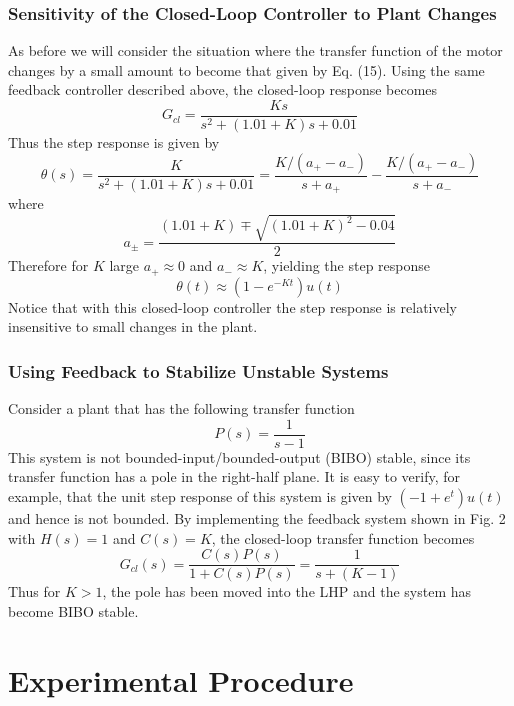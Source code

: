 \documentclass[12pt]{article}
\begin{document}
\subsubsection{Sensitivity of the Closed-Loop Controller to Plant Changes}
As before we will consider the situation where the transfer function of the motor changes by a small amount
to become that given by Eq. (15). Using the same feedback controller described above, the closed-loop
response becomes
\begin{equation}
G_{cl}=\frac{Ks}{s^2+(1.01+K)s+0.01}
\end{equation}
Thus the step response is given by
\begin{equation}
\theta(s)=\frac{K}{s^2+(1.01+K)s+0.01}=\frac{K/(a_+-a_-)}{s+a_+}-\frac{K/(a_+-a_-)}{s+a_-}
\end{equation}
where
\begin{equation}
a_\pm=\frac{(1.01+K)\mp\sqrt{(1.01+K)^2-0.04}}{2}
\end{equation}
Therefore for $K$ large $a_+\approx0$ and $a_-\approx K$, yielding the step response 
\begin{equation}
\theta(t)\approx(1-e^{-Kt})u(t)
\end{equation}
Notice that with this closed-loop controller the step response is relatively insensitive to small changes in the
plant.
\subsubsection{Using Feedback to Stabilize Unstable Systems}
Consider a plant that has the following transfer function
\begin{equation}
P(s)=\frac{1}{s-1}
\end{equation}
This system is not bounded-input/bounded-output (BIBO) stable, since its transfer function has a pole in
the right-half plane. It is easy to verify, for example, that the unit step response of this system is given by
$(−1 + e^t)u(t)$ and hence is not bounded. By implementing the feedback system shown in Fig. 2 with
$H(s)=1$ and $C(s)=K$, the closed-loop transfer function becomes
\begin{equation}
G_{cl}(s)=\frac{C(s)P(s)}{1+C(s)P(s)}=\frac{1}{s+(K-1)}
\end{equation}
Thus for $K>1$, the pole has been moved into the LHP and the system has become BIBO stable.
\section{Experimental Procedure}
\end{document}
